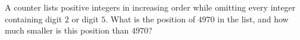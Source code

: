 A counter lists positive integers in increasing order while omitting every integer containing digit $2$ or digit $5$. What is the position of $4970$ in the list, and how much smaller is this position than $4970$?
